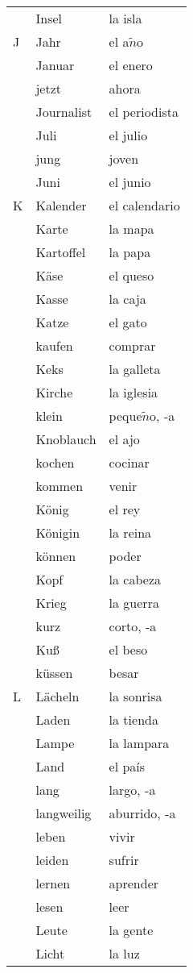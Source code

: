 \documentclass[10pt,spanish]{article}
\begin{document}
\begin{longtable}{p{} p{} | p{}}
& Insel & la isla  \\
J & Jahr & el a$\tilde{n}$o \\
& Januar & el enero  \\
& jetzt & ahora \\
& Journalist & el periodista  \\
& Juli & el julio  \\
& jung & joven \\
& Juni & el junio  \\
K & Kalender & el calendario  \\
& Karte & la mapa  \\
& Kartoffel & la papa  \\
& Käse & el queso  \\
& Kasse & la caja  \\
& Katze & el gato  \\
& kaufen & comprar  \\
& Keks & la galleta  \\
& Kirche & la iglesia  \\
& klein & peque$\tilde{n}$o, -a  \\
& Knoblauch & el ajo  \\
& kochen & cocinar  \\
& kommen & venir  \\
& König & el rey  \\
& Königin & la reina  \\
& können & poder  \\
& Kopf & la cabeza \\
& Krieg & la guerra  \\
& kurz & corto, -a  \\
& Kuß & el beso  \\
& küssen & besar  \\
L & Lächeln & la sonrisa  \\
& Laden & la tienda  \\
& Lampe & la lampara  \\
& Land & el país  \\
& lang & largo, -a  \\
& langweilig & aburrido, -a\\
& leben & vivir  \\
& leiden & sufrir  \\
& lernen & aprender  \\
& lesen & leer  \\
& Leute & la gente \\
& Licht & la luz \\

\end{longtable}
\end{document}
